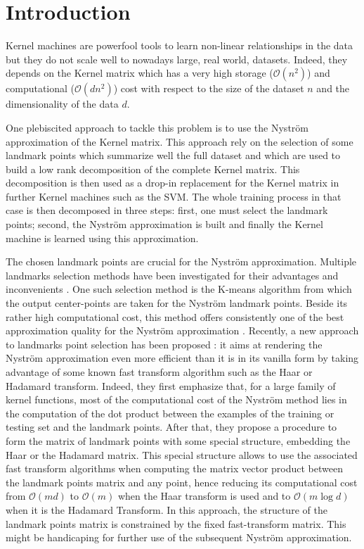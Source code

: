\section{Introduction}

Kernel machines are powerfool tools to learn non-linear relationships in the data but they do not scale well to nowadays large, real world, datasets. Indeed, they depends on the Kernel matrix which has a very high storage ($\mathcal{O}(n^2)$) and computational ($\mathcal{O}(dn^2)$) cost with respect to the size of the dataset $n$ and the dimensionality of the data $d$.

One plebiscited approach to tackle this problem is to use the Nyström approximation of the Kernel matrix. This approach rely on the selection of some landmark points which summarize well the full dataset and which are used to build a low rank decomposition of the complete Kernel matrix. This decomposition is then used as a drop-in replacement for the Kernel matrix in further Kernel machines such as the SVM. The whole training process in that case is then decomposed in three steps: first, one must select the landmark points; second, the Nyström approximation is built and finally the Kernel machine is learned using this approximation. 

The chosen landmark points are crucial for the Nyström approximation. Multiple landmarks selection methods have been investigated for their advantages and inconvenients \cite{kumar2012sampling}. One such selection method is the K-means algorithm \cite{kmeanspaper?} from which the output center-points are taken for the Nyström landmark points. Beside its rather high computational cost, this method offers consistently one of the best approximation quality for the Nyström approximation \cite{kmeansnystrom?}. Recently, a new approach to landmarks point selection has been proposed \cite{si2016computationally}: it aims at rendering the Nyström approximation even more efficient than it is in its vanilla form by taking advantage of some known fast transform algorithm such as the Haar or Hadamard transform. Indeed, they first emphasize that, for a large family of kernel functions, most of the computational cost of the Nyström method lies in the computation of the dot product between the examples of the training or testing set and the landmark points. After that, they propose a procedure to form the matrix of landmark points with some special structure, embedding the Haar or the Hadamard matrix. This special structure allows to use the associated fast transform algorithms when computing the matrix vector product between the landmark points matrix and any point, hence reducing its computational cost from $\mathcal{O}(md)$ to $\mathcal{O}(m)$ when the Haar transform is used and to $\mathcal{O}(m \log d)$ when it is the Hadamard Transform. In this approach, the structure of the landmark points matrix is constrained by the fixed fast-transform matrix. This might be handicaping for further use of the subsequent Nyström approximation.

